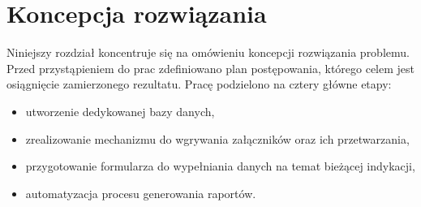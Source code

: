 \section{Koncepcja rozwiązania}

Niniejszy rozdział koncentruje się na omówieniu koncepcji rozwiązania problemu. Przed przystąpieniem do prac zdefiniowano plan postępowania, którego celem jest osiągnięcie zamierzonego rezultatu.
Pracę podzielono na cztery główne etapy:
\begin{itemize}
    \item utworzenie dedykowanej bazy danych,
    \item zrealizowanie mechanizmu do wgrywania załączników oraz ich przetwarzania,
    \item przygotowanie formularza do wypełniania danych na temat bieżącej indykacji,
    \item automatyzacja procesu generowania raportów.
\end{itemize}